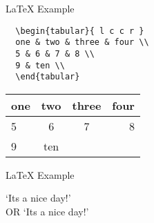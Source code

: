 \begin{frame}[t,fragile]{LaTeX Example}


\begin{lstlisting}
  \begin{tabular}{ l c c r }
  one & two & three & four \\
  5 & 6 & 7 & 8 \\
  9 & ten \\
  \end{tabular}
\end{lstlisting}

\begin{tabular}{ l | c || c r }
one & two & three & four \\ \hline
5 & 6 & 7 & 8 \\
9 & ten \\
\end{tabular}
\end{frame}

\begin{frame}[t,fragile]{LaTeX Example}

    `It\textquotesingle s a nice day!' \\
    OR
    `It{\textquotesingle}s a nice day!' \\
    
\end{frame}

